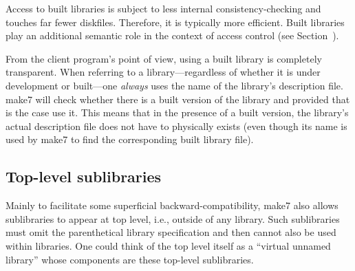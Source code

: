Access to built libraries is subject to less internal
consistency-checking and touches far fewer diskfiles.
Therefore, it is typically more efficient.  Built libraries
play an additional semantic role in the context of access control (see
Section~).

From the client program's point of view, using a built library is
completely transparent.  When referring to a library---regardless of
whether it is under development or built---one {\em always} uses the
name of the library's description file.  make7 will check whether there
is a built version of the library and provided that is the case use
it.  This means that in the presence of a built version, the
library's actual description file does not have to physically exists
(even though its name is used by make7 to find the corresponding built
library file).

\subsection{Top-level sublibraries}

Mainly to facilitate some superficial backward-compatibility, make7 also
allows sublibraries to appear at top level, i.e., outside of any library.
Such sublibraries must omit the parenthetical library specification and then
cannot also be used within libraries. One could think of the top level
itself as a ``virtual unnamed library'' whose components are these
top-level sublibraries.
